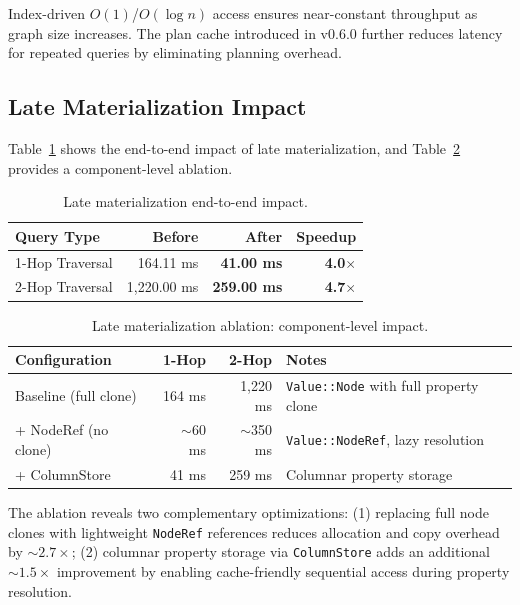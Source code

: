 \documentclass[11pt]{article}
\begin{document}
Index-driven $O(1)$/$O(\log n)$ access ensures near-constant throughput as graph size increases. The plan cache introduced in v0.6.0 further reduces latency for repeated queries by eliminating planning overhead.

\subsection{Late Materialization Impact}
\label{sec:late-mat-eval}

Table~\ref{tab:late-mat} shows the end-to-end impact of late materialization, and Table~\ref{tab:late-mat-ablation} provides a component-level ablation.

\begin{table}[H]
  \centering
  \caption{Late materialization end-to-end impact.}
  \label{tab:late-mat}
  \begin{tabular}{@{}lrrr@{}}
    \toprule
    \textbf{Query Type} & \textbf{Before} & \textbf{After} & \textbf{Speedup} \\
    \midrule
    1-Hop Traversal & 164.11 ms & \textbf{41.00 ms} & \textbf{4.0$\times$} \\
    2-Hop Traversal & 1,220.00 ms & \textbf{259.00 ms} & \textbf{4.7$\times$} \\
    \bottomrule
  \end{tabular}
\end{table}

\begin{table}[H]
  \centering
  \caption{Late materialization ablation: component-level impact.}
  \label{tab:late-mat-ablation}
  \begin{tabular}{@{}lrrp{4.5cm}@{}}
    \toprule
    \textbf{Configuration} & \textbf{1-Hop} & \textbf{2-Hop} & \textbf{Notes} \\
    \midrule
    Baseline (full clone)       & 164 ms & 1,220 ms & \texttt{Value::Node} with full property clone \\
    + NodeRef (no clone)        & ${\sim}$60 ms & ${\sim}$350 ms & \texttt{Value::NodeRef}, lazy resolution \\
    + ColumnStore               & 41 ms  & 259 ms   & Columnar property storage \\
    \bottomrule
  \end{tabular}
\end{table}

The ablation reveals two complementary optimizations: (1) replacing full node clones with lightweight \texttt{NodeRef} references reduces allocation and copy overhead by ${\sim}2.7\times$; (2) columnar property storage via \texttt{ColumnStore} adds an additional ${\sim}1.5\times$ improvement by enabling cache-friendly sequential access during property resolution.
\end{document}
